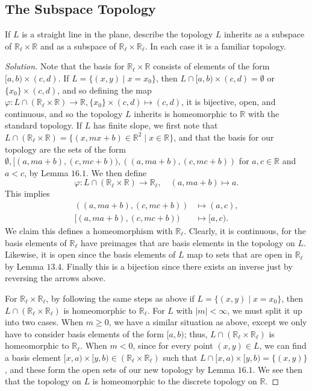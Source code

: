 \documentclass[12pt]{article}
\theoremstyle{remark}
\begin{document}
\setcounter{subsection}{15}
\subsection{The Subspace Topology}
\setcounter{subsubsection}{7}
\begin{problem}
  If $L$ is a straight line in the plane, describe the topology $L$ inherits as a subspace of $\mathbb{R}_\ell \times \mathbb{R}$ and as a subspace of $\mathbb{R}_\ell \times \mathbb{R}_\ell$. In each case it is a familiar topology.
\end{problem}
\begin{proof}[Solution]
  Note that the basis for $\mathbb{R}_\ell \times \mathbb{R}$ consists of
  elements of the form $[a,b) \times (c,d)$. If $L = \{(x,y) \mid x = x_0\}$,
  then $L \cap [a,b) \times (c,d) = \emptyset$ or $\{x_0\} \times (c,d)$, and
  so defining the map $\varphi\colon L \cap (\mathbb{R}_\ell \times \mathbb{R}) \to \mathbb{R}, \{x_0\} \times (c,d) \mapsto (c,d)$, it is bijective, open, and continuous, and so the topology $L$ inherits is homeomorphic to $\mathbb{R}$ with the standard topology. If $L$ has finite slope, we first note that $L \cap (\mathbb{R}_\ell \times \mathbb{R}) = \{(x,mx+b) \in \mathbb{R}^2 \mid x \in \mathbb{R}\}$, and that the basis for our topology are the sets of the form $\emptyset, [ (a,ma+b),(c,mc+b) ), ( (a,ma+b),(c,mc+b) )$ for $a,c \in \mathbb{R}$ and $a < c$, by Lemma $16.1$. We then define
  \begin{equation*}
    \varphi\colon L \cap (\mathbb{R}_\ell \times \mathbb{R}) \to
    \mathbb{R}_\ell, \quad (a,ma+b) \mapsto a.
  \end{equation*}
  This implies
  \begin{align*}
    ( (a,ma+b),(c,mc+b) ) &\mapsto (a,c),\\
    [ (a,ma+b),(c,mc+b) ) &\mapsto [a,c).
  \end{align*}
  We claim this defines a homeomorphism with $\mathbb{R}_\ell$. Clearly, it is continuous, for the basis elements of $\mathbb{R}_\ell$ have preimages that are basis elements in the topology on $L$. Likewise, it is open since the basis elements of $L$ map to sets that are open in $\mathbb{R}_\ell$ by Lemma $13.4$. Finally this is a bijection since there exists an inverse just by reversing the arrows above.
  \par For $\mathbb{R}_\ell \times \mathbb{R}_\ell$, by following the same steps
  as above if $L = \{(x,y) \mid x = x_0\}$, then $L \cap (\mathbb{R}_\ell \times
  \mathbb{R}_\ell)$ is homeomorphic to $\mathbb{R}_\ell$. For $L$ with $|m| <
  \infty$, we must split it up into two cases. When $m \ge 0$, we have a similar situation as above, except we only have to consider basis elements of the form $[a,b)$; thus, $L \cap (\mathbb{R}_\ell \times \mathbb{R}_\ell)$ is homeomorphic to $\mathbb{R}_\ell$. When $m < 0$, since for every point $(x,y) \in L$, we can find a basis element $[x,a)\times[y,b) \in (\mathbb{R}_\ell \times \mathbb{R}_\ell)$ such that $L \cap [x,a)\times[y,b) = \{(x,y)\}$, and these form the open sets of our new topology by Lemma $16.1$. We see then that the topology on $L$ is homeomorphic to the discrete topology on $\mathbb{R}$.
\end{proof}
\end{document}
